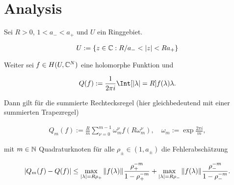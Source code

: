 \section{Analysis}

\begin{lemma}

    Sei $R > 0$, $1 < a_- < a_+$ und $U$ ein Ringgebiet.

    \begin{align*}
        U := {\left \{ z \in \mathbb{C}: R / a_- < {\left | z \right |} < R a_+ \right \}}
    \end{align*}

    Weiter sei $f \in H(U, \mathbb{C}^N)$ eine holomorphe Funktion und

    \begin{align*}
        Q(f)
        :=
        \frac{1}{2 \pi i}
        \Int[\abs{\lambda} = R]{f(\lambda)}{\lambda}.
    \end{align*}

    Dann gilt für die summierte Rechtecksregel (hier gleichbedeutend mit einer summierten Trapezregel)

    \begin{align*}
        Q_m(f)
        :=
        \frac{R}{m}
        \sum_{\nu = 0}^{m - 1}
            \omega_m^\nu
            f(R \omega_m^\nu),
        \quad
        \omega_m
        :=
        \exp \frac{2 \pi i}{m},
    \end{align*}

    mit $m \in \mathbb{N}$ Quadraturknoten für alle $\rho_\pm \in (1, a_\pm)$ die Fehlerabschätzung

    \begin{align*}
        {\left | Q_m(f) - Q(f) \right |}
        \leq
        \max_{{\left | \lambda \right |} = R \rho_+}
            {\left \| f(\lambda) \right \|}_{}
        \frac{\rho_+^{-m}}{1 - \rho_+^{-m}}
        +
        \max_{{\left | \lambda \right |} = R \rho_-}
            {\left \| f(\lambda) \right \|}_{}
        \frac{\rho_-^{-m}}{1 - \rho_-^{-m}}.
    \end{align*}

\end{lemma}

